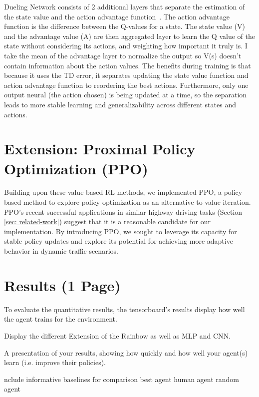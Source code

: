 \documentclass{article}
\begin{document}
Dueling Network consists of 2 additional layers that separate the estimation of the state value and the action advantage function~\cite{wang_dueling_2016}.
The action advantage function is the difference between the Q-values for a state.
The state value (V) and the advantage value (A) are then aggregated layer to learn the Q value of the state without considering its actions, and weighting how important it truly is.
I take the mean of the advantage layer to normalize the output so V(s) doesn't contain information about the action values.
The benefits during training is that because it uses the TD error, it separates updating the state value function and action advantage function to reordering the best actions.
Furthermore, only one output neural (the action chosen) is being updated at a time, so the separation leads to more stable learning and generalizability across different states and actions.

\section{Extension: Proximal Policy Optimization (PPO)}
Building upon these value-based RL methods, we implemented PPO, a policy-based method to explore policy optimization as an alternative to value iteration. PPO's recent successful applications in similar highway driving tasks (Section \ref{sec: related-work}) suggest that it is a reasonable candidate for our implementation. By introducing PPO, we sought to leverage its capacity for stable policy updates and explore its potential for achieving more adaptive behavior in dynamic traffic scenarios.


\section{Results (1 Page)}
To evaluate the quantitative results, the tensorboard's results display how well the agent trains for the environment.

Display the different Extension of the Rainbow as well as MLP and CNN.

A presentation of your results, showing how quickly and how well your agent(s) learn (i.e. improve their policies).

nclude informative baselines for comparison 
best agent
human agent
random agent

\end{document}
